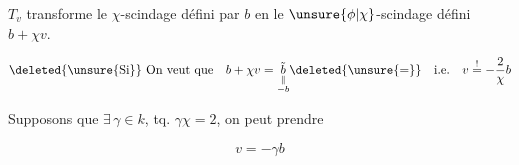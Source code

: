 $T_v$   transforme le $\chi$-scindage défini par $b$ en le $\unsure{\phi|\chi}$-scindage défini  $b+\chi v$.

\[
 \deleted{\unsure{\text{Si}}}\ \text{On veut que}\quad b+\chi v=\underset{\substack{\Vert\\-b}}{\tilde b}\deleted{\unsure{=}}
 \quad\text{i.e.}\quad v\overset{!}{=}-\frac2{\chi}b
\]

Supposons que $\exists\,\gamma\in k$, tq. $\gamma\chi=2$, on peut prendre \deleted{\unsure{$\xi$}}

\[
 \boxed{v=-\gamma b}
\]

